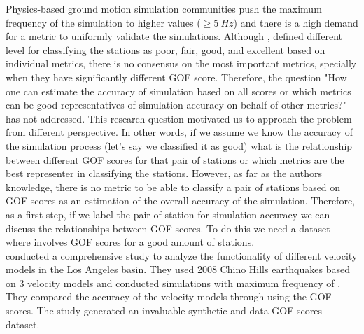 Physics-based ground motion simulation communities push the maximum frequency  of the simulation to higher values (\fmax{}$\geq 5 ~ Hz$) and there is a high demand for a metric to uniformly validate the simulations. Although \citet{Anderson_2004_Proc}, defined different level for classifying the stations as poor, fair, good, and excellent based on individual metrics, there is no consensus on the most important metrics, specially when they have significantly different GOF score. Therefore, the question "How one can estimate the accuracy of simulation based on all scores or which metrics can be good representatives of simulation accuracy on behalf of other metrics?" has not addressed. This research question motivated us to approach the problem from different perspective. In other words, if we assume we know the accuracy of the simulation process (let's say we classified it as good) what is the relationship between different GOF scores for that pair of stations or which metrics are the best representer in classifying the stations. However, as far as the authors knowledge, there is no metric to be able to classify a pair of stations based on GOF scores as an estimation of the overall accuracy of the simulation. Therefore, as a first step, if we label the pair of station for simulation accuracy we can discuss the relationships between GOF scores. To do this we need a dataset where involves GOF scores for a good amount of stations. \\  
 \citet{Taborda_2014_BSSA} conducted a comprehensive study to analyze the functionality of different velocity models in the Los Angeles basin. They used 2008 Chino Hills earthquakes based on 3 velocity models and conducted simulations with maximum frequency of . They compared the accuracy of the velocity models through using the GOF scores. The study generated an invaluable synthetic and data  GOF scores dataset.\\
